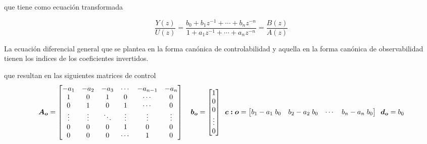 que tiene como ecuación transformada

\begin{equation*}
    \dfrac{Y(z)}{U(z)} = \dfrac{b_0 + b_1 z^{-1} + \cdots + b_n z^{-n}}{1 + a_1 z^{-1} + \cdots + a_n z^{-n}} = \dfrac{B(z)}{A(z)} 
\end{equation*}

\begin{obs}
    La ecuación diferencial general que se plantea en la forma canónica de controlabilidad
    y aquella en la forma canónica de observabilidad tienen los indices de los coeficientes invertidos.
\end{obs}
que resultan en las siguientes matrices de control
\begin{equation*}
    \bm{A_o} = 
    \begin{bmatrix}
    -a_1 & -a_2 & -a_3 & \cdots & -a_{n-1} & -a_n\\
    1 & 0 & 1 & 0 & \cdots & 0\\
    0 & 1 & 0 & 1 & \cdots & 0\\
    \vdots & \vdots & \ddots & \vdots & \vdots & \vdots \\
    0 & 0 & 0 & 1 & 0 & 0\\
    0 & 0 & 0 & \cdots & 1 & 0 \\
    \end{bmatrix}
    \hspace*{10pt}
    \bm{b_o} = 
    \begin{bmatrix}
    1 \\
    0 \\
    0 \\
    \vdots \\
    0\\
    \end{bmatrix}
    \hspace*{5pt}
    \bm{c:o} = 
    \begin{bmatrix}
    b_1 - a_1\; b_0 & b_2 - a_2\; b_0 & \cdots & b_n - a_n\; b_0
    \end{bmatrix}
    \hspace*{5pt}
    \bm{d_o} = b_0
\end{equation*}














